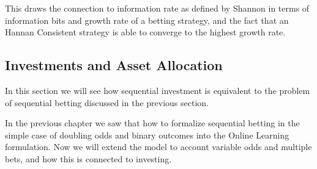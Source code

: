 This draws the connection to information rate as defined by Shannon in terms of information bits and growth rate of a betting strategy, and the fact that an Hannan Consistent strategy is able to converge to the highest growth rate. 

\subsection{Investments and Asset Allocation}

In this section we will see how sequential investment is equivalent to the problem of sequential betting discussed in the previous section.

In the previous chapter we saw that how to formalize sequential betting in the simple case of doubling odds and binary outcomes into the Online Learning formulation. Now we will extend the model to account variable odds and multiple bets, and how this is connected to investing.